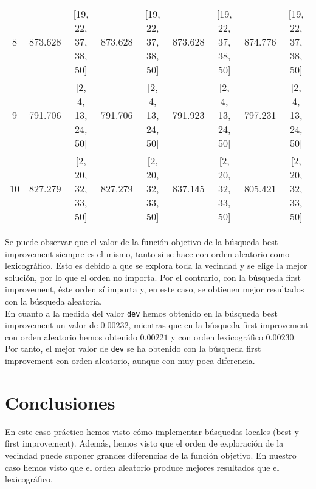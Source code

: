 \documentclass[12pt,a4paper,twoside,openright,titlepage,final]{article}
\begin{document}
\begin{table}[htbp!]
{\begin{tabular}{@{}ccccccccc@{}}
		8                          & 873.628          & {[}19, 22, 37, 38, 50{]} & 873.628          & {[}19, 22, 37, 38, 50{]} & 873.628          & {[}19, 22, 37, 38, 50{]} & 874.776          & {[}19, 22, 37, 38, 50{]} \\
		9                          & 791.706          & {[}2, 4, 13, 24, 50{]}   & 791.706          & {[}2, 4, 13, 24, 50{]}   & 791.923          & {[}2, 4, 13, 24, 50{]}   & 797.231          & {[}2, 4, 13, 24, 50{]}   \\
		10                         & 827.279          & {[}2, 20, 32, 33, 50{]}  & 827.279          & {[}2, 20, 32, 33, 50{]}  & 837.145          & {[}2, 20, 32, 33, 50{]}  & 805.421          & {[}2, 20, 32, 33, 50{]}  \\ \bottomrule
	\end{tabular}%
}
\end{table}

Se puede observar que el valor de la función objetivo de la búsqueda best improvement siempre es el mismo, tanto si se hace con orden aleatorio como lexicográfico. Esto es debido a que se explora toda la vecindad y se elige la mejor solución, por lo que el orden no importa. Por el contrario, con la búsqueda first improvement, éste orden sí importa y, en este caso, se obtienen mejor resultados con
la búsqueda aleatoria.\\

En cuanto a la medida del valor \texttt{dev} hemos obtenido en la búsqueda best improvement un valor de $0.00232$, mientras que en la búsqueda first improvement con orden aleatorio hemos obtenido $0.00221$ y con orden lexicográfico $0.00230$.\\

Por tanto, el mejor valor de \texttt{dev} se ha obtenido con la búsqueda first improvement con orden aleatorio, aunque con muy poca diferencia.
\section{Conclusiones}

En este caso práctico hemos visto cómo implementar búsquedas locales (best y first improvement). Además, hemos visto que el orden de exploración de la vecindad puede suponer grandes diferencias de la función objetivo. En nuestro caso hemos visto que el orden aleatorio produce mejores resultados que el lexicográfico.  
\end{document}
